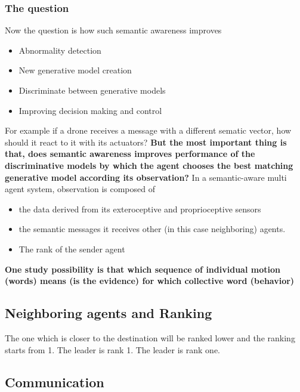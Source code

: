 \documentclass{article}
\begin{document}
			\subsubsection{The question} Now the question is how such semantic awareness improves
				\begin{itemize}
					\item Abnormality detection
					\item New generative model creation
					\item Discriminate between generative models
					\item Improving decision making and control 
				\end{itemize}
				For example if a drone receives a message with a different sematic vector, how should it react to it with its actuators?
				\textbf{But the most important thing is that, does semantic awareness improves performance of the discriminative models by which the agent chooses the best matching generative model according its observation?}
				In a semantic-aware multi agent system, 
				observation is composed of 
				\begin{itemize}
					\item the data derived from its exteroceptive and proprioceptive sensors
					\item the semantic messages it receives other (in this case neighboring) agents.
					\item The rank of the sender agent
				\end{itemize}
			\textbf{One study possibility is that which sequence of individual motion (words) means (is the evidence) for which collective word (behavior)}
		\subsection{Neighboring agents and Ranking}
			The one which is closer to the destination will be ranked lower and the ranking starts from 1. The leader is rank 1. The leader is rank one.
		\subsection{Communication}
\end{document}
